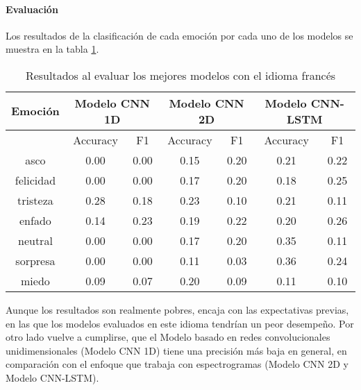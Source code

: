 \documentclass[11pt,a4paper,spanish]{book}
\begin{document}
	\paragraph{Evaluación}
	Los resultados de la clasificación de cada emoción por cada uno de los modelos se muestra en la tabla \ref{results_TestFrench}.
	
	\begin{table}[H]
		\centering
		\begin{center}
			\begin{tabular}{| c|| c c |  c c |  c c | }
				\hline
				\multicolumn{1}{|c||}{Emoción} & 
				\multicolumn{2}{|c|}{Modelo CNN 1D}&
				\multicolumn{2}{|c|}{Modelo CNN 2D} &
				\multicolumn{2}{|c|}{Modelo CNN-LSTM} \\
				
				\hline
				& 
				\multicolumn{1}{|c|}{Accuracy}&\multicolumn{1}{|c|}{F1}&
				\multicolumn{1}{|c|}{Accuracy}&\multicolumn{1}{|c|}{F1}&
				\multicolumn{1}{|c|}{Accuracy}&\multicolumn{1}{|c|}{F1}\\
				\hline
				
				asco 		& 0.00 & 0.00 & 0.15 & 0.20 & 0.21 & 0.22\\
				felicidad 	& 0.00 & 0.00 & 0.17 & 0.20 & 0.18 & 0.25 \\
				tristeza 	& 0.28 & 0.18 & 0.23 & 0.10 & 0.21 & 0.11 \\
				enfado 		& 0.14 & 0.23 & 0.19 & 0.22 & 0.20 & 0.26 \\
				neutral 	& 0.00 & 0.00 & 0.17 & 0.20 & 0.35 & 0.11 \\
				sorpresa 	& 0.00 & 0.00 & 0.11 & 0.03 & 0.36 & 0.24 \\
				miedo 		& 0.09 & 0.07 & 0.20 & 0.09 & 0.11 & 0.10 \\
				\hline
			\end{tabular}
			
			\caption{Resultados al evaluar los mejores modelos con el idioma francés}
			\label{results_TestFrench}
		\end{center}
	\end{table}

	Aunque los resultados son realmente pobres, encaja con las expectativas previas, en las que los modelos evaluados en este idioma tendrían un peor desempeño. Por otro lado vuelve a cumplirse, que el Modelo basado en redes convolucionales unidimensionales (Modelo CNN 1D) tiene una precisión más baja en general, en comparación con el enfoque que trabaja con espectrogramas (Modelo CNN 2D y Modelo CNN-LSTM). 


		
		
		
		
		
		
		

	\printbibliography
	
\end{document}
